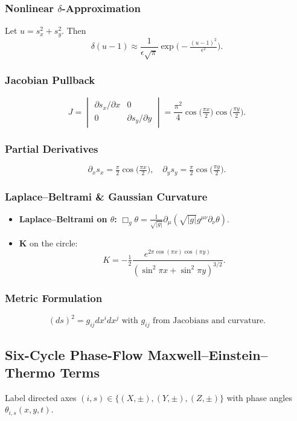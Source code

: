 ﻿\documentclass[12pt]{article}
\begin{document}
\subsubsection{Nonlinear $\delta$-Approximation}
Let $u=s_x^2+s_y^2$. Then
$$
\delta(u-1)\approx\frac{1}{\epsilon\sqrt\pi}\exp\!\bigl(-\tfrac{(u-1)^2}{\epsilon^2}\bigr).
$$

\subsubsection{Jacobian Pullback}
$$
J = \begin{vmatrix} \partial s_x/\partial x & 0 \\
                             0                             & \partial s_y/\partial y \end{vmatrix}
    = \frac{\pi^2}{4}\cos\bigl(\tfrac{\pi x}{2}\bigr)\cos\bigl(\tfrac{\pi y}{2}\bigr).
$$

\subsubsection{Partial Derivatives}
$$
\partial_x s_x = \tfrac{\pi}{2}\cos\bigl(\tfrac{\pi x}{2}\bigr),
\quad
\partial_y s_y = \tfrac{\pi}{2}\cos\bigl(\tfrac{\pi y}{2}\bigr).
$$

\subsubsection{Laplace–Beltrami \& Gaussian Curvature}
\begin{itemize}
   \item \textbf{Laplace–Beltrami on $\theta$:} $\Box_g\theta = \frac{1}{\sqrt{|g|}}\partial_\mu(\sqrt{|g|}g^{\mu\nu}\partial_\nu\theta)$.
   \item \textbf{K} on the circle:
  $$
  K=-\tfrac12\frac{e^{2\pi\cos(\pi x)\cos(\pi y)}}{(\sin^2\pi x+\sin^2\pi y)^{3/2}}.
  $$
\end{itemize}

\subsubsection{Metric Formulation}
$$(ds)^2=g_{ij}dx^i dx^j \text{ with } g_{ij} \text{ from Jacobians and curvature}.$$

\subsection{Six-Cycle Phase-Flow Maxwell–Einstein–Thermo Terms}
Label directed axes $(i,s)\in\{(X,\pm),(Y,\pm),(Z,\pm)\}$ with phase angles $\theta_{i,s}(x,y,t)$.
\end{document}
